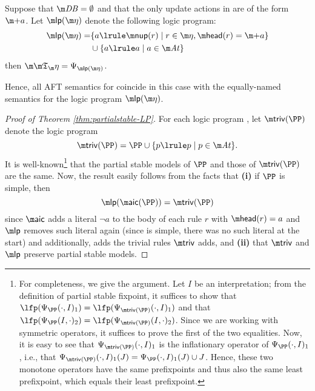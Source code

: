 \begin{proposition}\label{prop:lplink}
  Suppose that $\db=\emptyset$ and that the only update actions in \aics are of the form $\add a$.
  Let $\lpop(\aics)$ denote the following logic program:  
 \begin{align*}
  \lpop(\aics)=& \{a \lrule \nup(r)\mid r\in \aics, \head(r)= \add a\}\\
  &\cup \{a \lrule a\mid a \in \atoms\}
 \end{align*}
 then $\Ap = \Psi_{\lpop(\aics)}$. 

Hence, all AFT semantics for \fulldb coincide in this case with the equally-named semantics for the logic program $\lpop(\aics)$. 
\end{proposition}



\begin{proof}[Proof of Theorem \ref{thm:partialstable-LP}]
 For each logic program \PP, let $\triv(\PP)$ denote the logic program 
 \[
  \triv(\PP) = \PP \cup \{p\lrule p\mid p\in \atoms\}.
 \]
 It is well-known\footnote{For completeness, we give the argument. Let $I$ be an interpretation; from the definition of partial stable fixpoint, it suffices to show that 
 $\lfp(\Psi_\PP(\cdot,I)_1)= \lfp(\Psi_{\triv(\PP)}(\cdot,I)_1)$ and that 
  $\lfp(\Psi_\PP(I,\cdot)_2)= \lfp(\Psi_{\triv(\PP)}(I,\cdot)_2)$. Since we are working with symmetric operators, it suffices to prove the first of the two equalities. 
  Now, it is easy to see that $\Psi_{\triv(\PP)}(\cdot,I)_1$ is the inflationary operator of $\Psi_\PP(\cdot,I)_1$, i.e., that $\Psi_{\triv(\PP)}(\cdot,I)_1(J) = \Psi_\PP(\cdot,I)_1(J)\cup J$. Hence, these two monotone operators have the same prefixpoints and thus also the same least prefixpoint, which equals their least prefixpoint. 
  }
 that the partial stable models of $\PP$ and those of $\triv(\PP)$ are the same. 
 Now, the result easily follows from the facts that \textbf{(i)} if $\PP$ is simple, then
\[
\lpop(\aicop(\PP)) = \triv(\PP)\]
since $\aicop$ adds a literal $\lnot a$ to the body of each rule $r$ with $\head(r) = a$ and $\lpop$ removes such literal again (since \PP is simple, there was no such literal at the start) and additionally, adds the trivial rules $\triv$ adds, and \textbf{(ii)} 
 that $\triv$ and $\lpop$ preserve partial stable models. 
% 
\end{proof}


